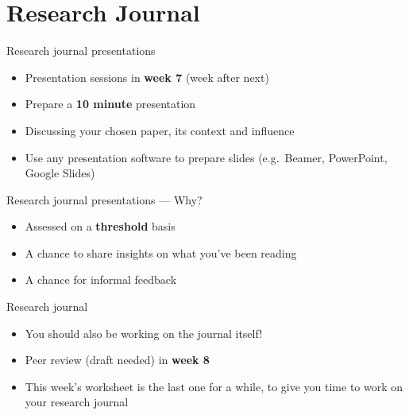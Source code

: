 \part{Research Journal}
\frame{\partpage}

\begin{frame}{Research journal presentations}
    \begin{itemize}
        \pause\item Presentation sessions in \textbf{week 7} (week after next)
        \pause\item Prepare a \textbf{10 minute} presentation
        \pause\item Discussing your chosen paper, its context and influence
        \pause\item Use any presentation software to prepare slides (e.g.\ Beamer, PowerPoint, Google Slides)
    \end{itemize}
\end{frame}

\begin{frame}{Research journal presentations --- Why?}
    \begin{itemize}
        \pause\item Assessed on a \textbf{threshold} basis
        \pause\item A chance to share insights on what you've been reading
        \pause\item A chance for informal feedback
    \end{itemize}
\end{frame}

\begin{frame}{Research journal}
    \begin{itemize}
        \pause\item You should also be working on the journal itself!
        \pause\item Peer review (draft needed) in \textbf{week 8}
        \pause\item This week's worksheet is the last one for a while, to give you time to work on your research journal
    \end{itemize}
\end{frame}
